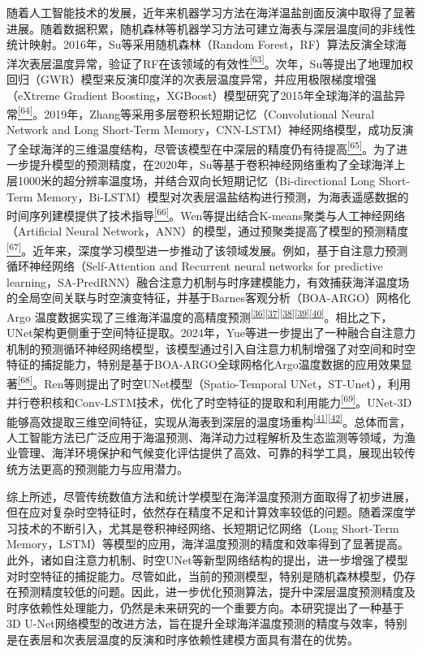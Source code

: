 \documentclass[
  12pt,
]{article}
\begin{document}
随着人工智能技术的发展，近年来机器学习方法在海洋温盐剖面反演中取得了显著进展。随着数据积累，随机森林等机器学习方法可建立海表与深层温度间的非线性统计映射。2016年，Su等采用随机森林（Random
Forest，RF）算法反演全球海洋次表层温度异常，验证了RF在该领域的有效性\hyperref[_Ref165148613]{\textsuperscript{{[}63{]}}}。次年，Su等提出了地理加权回归（GWR）模型来反演印度洋的次表层温度异常，并应用极限梯度增强（eXtreme
Gradient
Boosting，XGBoost）模型研究了2015年全球海洋的温盐异常\hyperref[_Ref165148613]{\textsuperscript{{[}64{]}}}。2019年，Zhang等采用多层卷积长短期记忆（Convolutional
Neural Network and Long Short-Term
Memory，CNN-LSTM）神经网络模型，成功反演了全球海洋的三维温度结构，尽管该模型在中深层的精度仍有待提高\hyperref[_Ref165148613]{\textsuperscript{{[}65{]}}}。为了进一步提升模型的预测精度，在2020年，Su等基于卷积神经网络重构了全球海洋上层1000米的超分辨率温度场，并结合双向长短期记忆（Bi-directional
Long Short-Term
Memory，Bi-LSTM）模型对次表层温盐结构进行预测，为海表遥感数据的时间序列建模提供了技术指导\hyperref[_Ref165148613]{\textsuperscript{{[}66{]}}}。Wen等提出结合K-means聚类与人工神经网络（Artificial
Neural
Network，ANN）的模型，通过预聚类提高了模型的预测精度\hyperref[_Ref165148613]{\textsuperscript{{[}67{]}}}。近年来，深度学习模型进一步推动了该领域发展。例如，基于自注意力预测循环神经网络（Self-Attention
and Recurrent neural networks for predictive
learning，SA-PredRNN）融合注意力机制与时序建模能力，有效捕获海洋温度场的全局空间关联与时空演变特征，并基于Barnes客观分析（BOA-ARGO）网格化
Argo
温度数据实现了三维海洋温度的高精度预测\textsuperscript{\hyperref[_Ref165148613]{{[}36{]}}\hyperref[_Ref165148613]{{[}37{]}}\hyperref[_Ref165148613]{{[}38{]}}\hyperref[_Ref165148613]{{[}39{]}}\hyperref[_Ref165148613]{{[}40{]}}}。相比之下，UNet架构更侧重于空间特征提取。2024年，Yue等进一步提出了一种融合自注意力机制的预测循环神经网络模型，该模型通过引入自注意力机制增强了对空间和时空特征的捕捉能力，特别是基于BOA-ARGO全球网格化Argo温度数据的应用效果显著\hyperref[_Ref165148613]{\textsuperscript{{[}68{]}}}。Ren等则提出了时空UNet模型（Spatio-Temporal
UNet，ST-Unet），利用并行卷积核和Conv-LSTM技术，优化了时空特征的提取和利用能力\hyperref[_Ref165148613]{\textsuperscript{{[}69{]}}}。UNet-3D能够高效提取三维空间特征，实现从海表到深层的温度场重构\textsuperscript{\hyperref[_Ref165148613]{{[}41{]}}\hyperref[_Ref165148613]{{[}42{]}}}。总体而言，人工智能方法已广泛应用于海温预测、海洋动力过程解析及生态监测等领域，为渔业管理、海洋环境保护和气候变化评估提供了高效、可靠的科学工具，展现出较传统方法更高的预测能力与应用潜力。

综上所述，尽管传统数值方法和统计学模型在海洋温度预测方面取得了初步进展，但在应对复杂时空特征时，依然存在精度不足和计算效率较低的问题。随着深度学习技术的不断引入，尤其是卷积神经网络、长短期记忆网络（Long
Short-Term
Memory，LSTM）等模型的应用，海洋温度预测的精度和效率得到了显著提高。此外，诸如自注意力机制、时空UNet等新型网络结构的提出，进一步增强了模型对时空特征的捕捉能力。尽管如此，当前的预测模型，特别是随机森林模型，仍存在预测精度较低的问题。因此，进一步优化预测算法，提升中深层温度预测精度及时序依赖性处理能力，仍然是未来研究的一个重要方向。本研究提出了一种基于3D
U-Net网络模型的改进方法，旨在提升全球海洋温度预测的精度与效率，特别是在表层和次表层温度的反演和时序依赖性建模方面具有潜在的优势。
\end{document}
